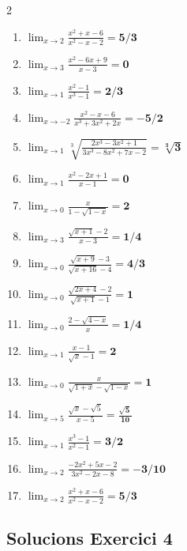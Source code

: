 \documentclass[12pt,a4paper]{article}
\begin{document}
\begin{multicols}{2}
\begin{enumerate}[label=3.\arabic*.]
    \item $\displaystyle \lim_{x \to 2} \frac{x^2+x-6}{x^2-x-2} = \mathbf{5/3}$
    \item $\displaystyle \lim_{x \to 3} \frac{x^2-6x+9}{x-3} = \mathbf{0}$
    \item $\displaystyle \lim_{x \to 1} \frac{x^2-1}{x^3-1} = \mathbf{2/3}$
    \item $\displaystyle \lim_{x \to -2} \frac{x^2-x-6}{x^3+3x^2+2x} = \mathbf{-5/2}$
    \item $\displaystyle \lim_{x \to 1} \sqrt[3]{\frac{2x^3-3x^2+1}{3x^3-8x^2+7x-2}} = \mathbf{\sqrt[3]{3}}$
    \item $\displaystyle \lim_{x \to 1} \frac{x^2-2x+1}{x-1} = \mathbf{0}$
    \item $\displaystyle \lim_{x \to 0} \frac{x}{1-\sqrt{1-x}} = \mathbf{2}$
    \item $\displaystyle \lim_{x \to 3} \frac{\sqrt{x+1}-2}{x-3} = \mathbf{1/4}$
    \item $\displaystyle \lim_{x \to 0} \frac{\sqrt{x+9}-3}{\sqrt{x+16}-4} = \mathbf{4/3}$
    \item $\displaystyle \lim_{x \to 0} \frac{\sqrt{2x+4}-2}{\sqrt{x+1}-1} = \mathbf{1}$
    \item $\displaystyle \lim_{x \to 0} \frac{2-\sqrt{4-x}}{x} = \mathbf{1/4}$
    \item $\displaystyle \lim_{x \to 1} \frac{x-1}{\sqrt{x}-1} = \mathbf{2}$
    \item $\displaystyle \lim_{x \to 0} \frac{x}{\sqrt{1+x}-\sqrt{1-x}} = \mathbf{1}$
    \item $\displaystyle \lim_{x \to 5} \frac{\sqrt{x}-\sqrt{5}}{x-5} = \mathbf{\frac{\sqrt{5}}{10}}$
    \item $\displaystyle \lim_{x \to 1} \frac{x^3-1}{x^2-1} = \mathbf{3/2}$
    \item $\displaystyle \lim_{x \to 2} \frac{-2x^2+5x-2}{3x^2-2x-8} = \mathbf{-3/10}$
    \item $\displaystyle \lim_{x \to 2} \frac{x^2+x-6}{x^2-x-2} = \mathbf{5/3}$
\end{enumerate}
\end{multicols}

\subsection*{Solucions Exercici 4}
\end{document}

